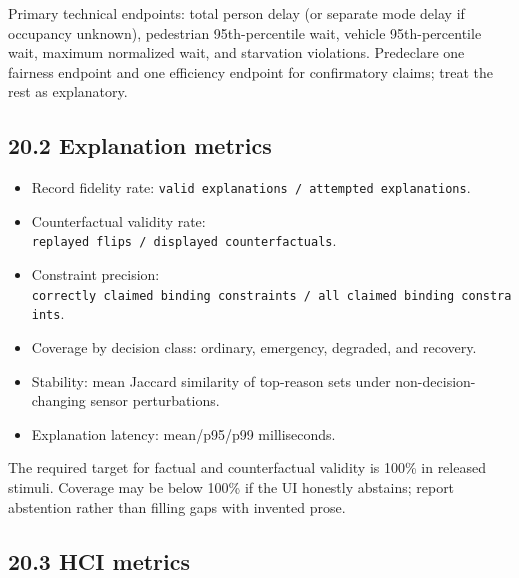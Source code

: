 \documentclass[
  english,
  11pt,
  a4paper,
]{article}
\providecommand{\tightlist}{%
  \setlength{\itemsep}{0pt}\setlength{\parskip}{0pt}}
\begin{document}
Primary technical endpoints: total person delay (or separate mode delay
if occupancy unknown), pedestrian 95th-percentile wait, vehicle
95th-percentile wait, maximum normalized wait, and starvation
violations. Predeclare one fairness endpoint and one efficiency endpoint
for confirmatory claims; treat the rest as explanatory.

\subsection{20.2 Explanation metrics}\label{explanation-metrics}

\begin{itemize}
\tightlist
\item
  Record fidelity rate:
  \texttt{valid\ explanations\ /\ attempted\ explanations}.
\item
  Counterfactual validity rate:
  \texttt{replayed\ flips\ /\ displayed\ counterfactuals}.
\item
  Constraint precision:
  \texttt{correctly\ claimed\ binding\ constraints\ /\ all\ claimed\ binding\ constraints}.
\item
  Coverage by decision class: ordinary, emergency, degraded, and
  recovery.
\item
  Stability: mean Jaccard similarity of top-reason sets under
  non-decision-changing sensor perturbations.
\item
  Explanation latency: mean/p95/p99 milliseconds.
\end{itemize}

The required target for factual and counterfactual validity is 100\% in
released stimuli. Coverage may be below 100\% if the UI honestly
abstains; report abstention rather than filling gaps with invented
prose.

\subsection{20.3 HCI metrics}\label{hci-metrics}
\end{document}
